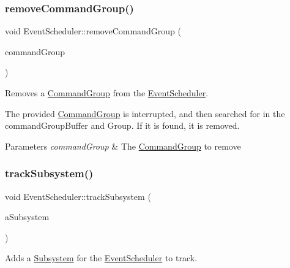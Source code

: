 \subsubsection{\texorpdfstring{removeCommandGroup()}{removeCommandGroup()}}
{\footnotesize\ttfamily void Event\+Scheduler\+::remove\+Command\+Group (\begin{DoxyParamCaption}\item[{\mbox{\hyperlink{classlib_iterative_robot_1_1_command_group}{Command\+Group}} $\ast$}]{command\+Group }\end{DoxyParamCaption})}



Removes a \mbox{\hyperlink{classlib_iterative_robot_1_1_command_group}{Command\+Group}} from the \mbox{\hyperlink{classlib_iterative_robot_1_1_event_scheduler}{Event\+Scheduler}}. 

The provided \mbox{\hyperlink{classlib_iterative_robot_1_1_command_group}{Command\+Group}} is interrupted, and then searched for in the command\+Group\+Buffer and Group. If it is found, it is removed.


\begin{DoxyParams}{Parameters}
{\em command\+Group} & The \mbox{\hyperlink{classlib_iterative_robot_1_1_command_group}{Command\+Group}} to remove \\
\hline
\end{DoxyParams}
\mbox{\label{classlib_iterative_robot_1_1_event_scheduler_a1130cfd602dec9e4091571b47b60f378}} 
\subsubsection{\texorpdfstring{trackSubsystem()}{trackSubsystem()}}
{\footnotesize\ttfamily void Event\+Scheduler\+::track\+Subsystem (\begin{DoxyParamCaption}\item[{\mbox{\hyperlink{classlib_iterative_robot_1_1_subsystem}{Subsystem}} $\ast$}]{a\+Subsystem }\end{DoxyParamCaption})}



Adds a \mbox{\hyperlink{classlib_iterative_robot_1_1_subsystem}{Subsystem}} for the \mbox{\hyperlink{classlib_iterative_robot_1_1_event_scheduler}{Event\+Scheduler}} to track. 


